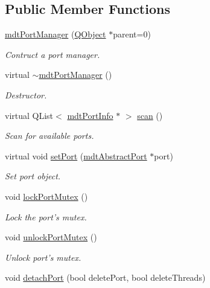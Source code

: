 \subsection*{Public Member Functions}
\begin{DoxyCompactItemize}
\item 
\hyperlink{classmdt_port_manager_a5ec36523089b7528d973e29cdbc64d01}{mdt\-Port\-Manager} (\hyperlink{class_q_object}{Q\-Object} $\ast$parent=0)
\begin{DoxyCompactList}\small\item\em Contruct a port manager. \end{DoxyCompactList}\item 
virtual \hyperlink{classmdt_port_manager_adf797f8fd7a3ffdc000890a224e4c1b6}{$\sim$mdt\-Port\-Manager} ()
\begin{DoxyCompactList}\small\item\em Destructor. \end{DoxyCompactList}\item 
virtual Q\-List$<$ \hyperlink{classmdt_port_info}{mdt\-Port\-Info} $\ast$ $>$ \hyperlink{classmdt_port_manager_ad56afb411ab5468005fca04767557ece}{scan} ()
\begin{DoxyCompactList}\small\item\em Scan for available ports. \end{DoxyCompactList}\item 
virtual void \hyperlink{classmdt_port_manager_afcd156b2d0c9d340999935efb6cd8cb6}{set\-Port} (\hyperlink{classmdt_abstract_port}{mdt\-Abstract\-Port} $\ast$port)
\begin{DoxyCompactList}\small\item\em Set port object. \end{DoxyCompactList}\item 
void \hyperlink{classmdt_port_manager_a3107b7121dfe5b9686d9b3b3a48a0af0}{lock\-Port\-Mutex} ()
\begin{DoxyCompactList}\small\item\em Lock the port's mutex. \end{DoxyCompactList}\item 
void \hyperlink{classmdt_port_manager_a882e6bf95dac9cd4ab8cc93ecc524874}{unlock\-Port\-Mutex} ()
\begin{DoxyCompactList}\small\item\em Unlock port's mutex. \end{DoxyCompactList}\item 
void \hyperlink{classmdt_port_manager_a39cb4af4aedc0b6b7c4d4f53002c3fd1}{detach\-Port} (bool delete\-Port, bool delete\-Threads)

\end{DoxyCompactItemize}
